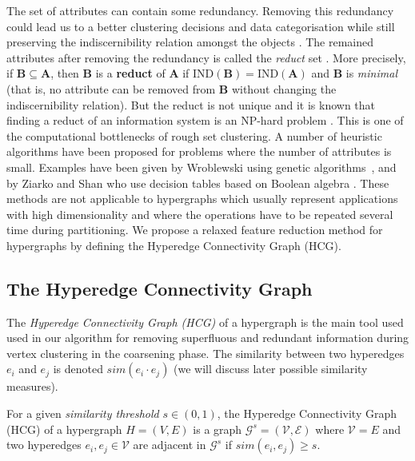 \documentclass[twocolumn]{svjour3}          \smartqed
\begin{document}
The set of attributes can contain some redundancy. Removing this redundancy could lead us to a better clustering decisions and data categorisation while still preserving the indiscernibility relation amongst the objects \cite{wroblewski1998,ziarko1995}. The remained attributes after removing the redundancy is called the \textit{reduct} set \cite{roughreview2009}.  More precisely, if $\mathbf{B} \subseteq \mathbf{A}$, then $\mathbf{B}$ is a \textbf{reduct} of $\mathbf{A}$ if $\mbox{IND}(\mathbf{B}) = \mbox{IND}(\mathbf{A})$ and $\mathbf{B}$ is \emph{minimal} (that is, no attribute can be removed from $\mathbf{B}$ without changing the indiscernibility relation).  But the reduct is not unique and it is known that 
finding a reduct of an information system is an NP-hard problem \cite{skowron1992}. This is one of the computational bottlenecks of rough set 
clustering. A number of heuristic algorithms have been proposed for problems where the number of attributes is small. Examples have been given by Wroblewski using genetic algorithms~\cite{wroblewski1995,wroblewski1998}, and by Ziarko and Shan who use decision tables based on Boolean algebra \cite{ziarko1995}. These methods are not applicable to hypergraphs which usually represent applications with high dimensionality and where the operations have to be repeated several time during partitioning. We propose a relaxed feature reduction method for hypergraphs by defining the Hyperedge Connectivity Graph (HCG).

\subsection{The Hyperedge Connectivity Graph}\label{sec:hcg}

The \textit{Hyperedge Connectivity Graph (HCG)} of a hypergraph is the main tool used used in our algorithm for removing superfluous and redundant information during vertex clustering in the coarsening phase.  The similarity between two hyperedges $e_i$ and $e_j$ is denoted $sim(e_i \cdot e_j)$ (we will discuss later possible similarity measures). 

\begin{definition}  \label{def:hcg}
For a given \textit{similarity threshold} $s \in (0,1)$, the Hyperedge Connectivity Graph (HCG) of a hypergraph $H=(V,E)$ is a graph $\mathcal{G}^s=(\mathcal{V},\mathcal{E})$ where $\mathcal{V}=E$ and two hyperedges $e_i,e_j \in \mathcal{V}$ are adjacent in $\mathcal{G}^s$ if $sim(e_i,e_j) \geqslant s$.
\end{definition}
\end{document}
